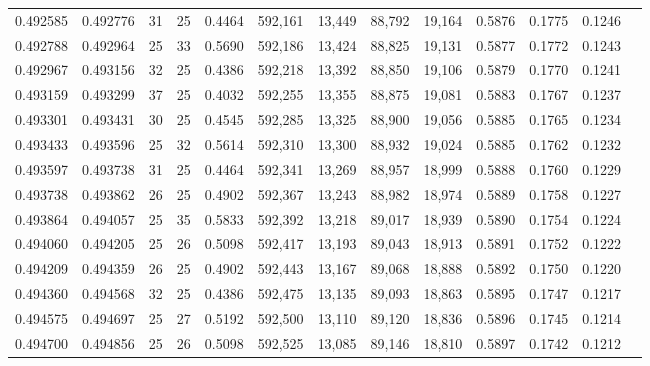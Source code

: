 \begin{tabular}{rrrrrrrrrrrrr}
0.492585 & 0.492776 &    31 &  25 &                                     0.4464 & 592,161 &  13,449 &  88,792 &  19,164 & 0.5876 & 0.1775 & 0.1246 \\
0.492788 & 0.492964 &    25 &  33 &                                     0.5690 & 592,186 &  13,424 &  88,825 &  19,131 & 0.5877 & 0.1772 & 0.1243 \\
0.492967 & 0.493156 &    32 &  25 &                                     0.4386 & 592,218 &  13,392 &  88,850 &  19,106 & 0.5879 & 0.1770 & 0.1241 \\
0.493159 & 0.493299 &    37 &  25 &                                     0.4032 & 592,255 &  13,355 &  88,875 &  19,081 & 0.5883 & 0.1767 & 0.1237 \\
0.493301 & 0.493431 &    30 &  25 &                                     0.4545 & 592,285 &  13,325 &  88,900 &  19,056 & 0.5885 & 0.1765 & 0.1234 \\
0.493433 & 0.493596 &    25 &  32 &                                     0.5614 & 592,310 &  13,300 &  88,932 &  19,024 & 0.5885 & 0.1762 & 0.1232 \\
0.493597 & 0.493738 &    31 &  25 &                                     0.4464 & 592,341 &  13,269 &  88,957 &  18,999 & 0.5888 & 0.1760 & 0.1229 \\
0.493738 & 0.493862 &    26 &  25 &                                     0.4902 & 592,367 &  13,243 &  88,982 &  18,974 & 0.5889 & 0.1758 & 0.1227 \\
0.493864 & 0.494057 &    25 &  35 &                                     0.5833 & 592,392 &  13,218 &  89,017 &  18,939 & 0.5890 & 0.1754 & 0.1224 \\
0.494060 & 0.494205 &    25 &  26 &                                     0.5098 & 592,417 &  13,193 &  89,043 &  18,913 & 0.5891 & 0.1752 & 0.1222 \\
0.494209 & 0.494359 &    26 &  25 &                                     0.4902 & 592,443 &  13,167 &  89,068 &  18,888 & 0.5892 & 0.1750 & 0.1220 \\
0.494360 & 0.494568 &    32 &  25 &                                     0.4386 & 592,475 &  13,135 &  89,093 &  18,863 & 0.5895 & 0.1747 & 0.1217 \\
0.494575 & 0.494697 &    25 &  27 &                                     0.5192 & 592,500 &  13,110 &  89,120 &  18,836 & 0.5896 & 0.1745 & 0.1214 \\
0.494700 & 0.494856 &    25 &  26 &                                     0.5098 & 592,525 &  13,085 &  89,146 &  18,810 & 0.5897 & 0.1742 & 0.1212 \\

\end{tabular}
